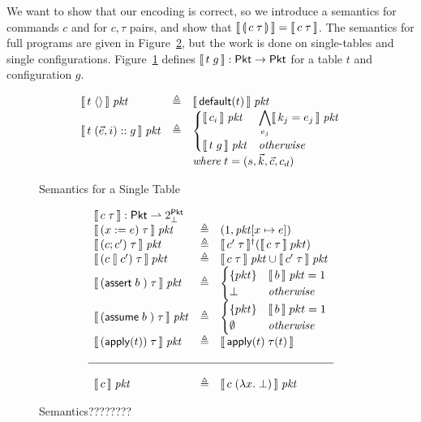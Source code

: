 We want to show that our encoding is correct, so we introduce a semantics for
commands $c$ and for $c,\tau$ pairs, and show that
$\llbracket\,\llparenthesis\, c\; \tau\, \rrparenthesis\,\rrbracket = \llbracket\,c\; \tau\,\rrbracket$. The semantics for full
programs are given in Figure~\ref{fig:semantics}, but the work is done on
single-tables and single configurations. Figure~\ref{fig:tablesemantics} defines
$\llbracket\,t\; g\,\rrbracket : \mathsf{Pkt} \to \mathsf{Pkt}$ for a table $t$ and configuration $g$.

\begin{figure}[ht]
  \[\begin{array}{lcl}
      \llbracket\,t\; \langle\rangle\,\rrbracket\; \mathit{pkt}
      &\triangleq& \llbracket\,\mathsf{default}(t)\,\rrbracket\; \mathit{pkt} \\
      \llbracket\, t\; (\vec e, i)::g\,\rrbracket\; \mathit{pkt}
      &\triangleq& \begin{cases}
        \llbracket\,c_i\,\rrbracket\; \mathit{pkt} & \displaystyle \bigwedge_{e_j} \llbracket\,k_j = e_j\,\rrbracket\; \mathit{pkt} \\
        \llbracket\,t\; g\,\rrbracket\; \mathit{pkt} & \mathit{otherwise}
      \end{cases}\\
      && \mathit{where}\; t = (s, \vec k, \vec c, c_d)
    \end{array}\]
  \caption{Semantics for a Single Table}
  \label{fig:tablesemantics}
\end{figure}


\begin{figure}[ht]
  \[\begin{array}{lcl}
      \multicolumn 3 l {\bracbb{c\; \tau} : \Pkt \rightharpoonup 2^\Pkt_\bot} \\
      \bracbb{(x:=e)\; \tau}\; \pkt & \triangleq & (1,\pkt[x \mapsto e]) \\
      \bracbb{(c;c')\; \tau}\; \pkt & \triangleq & \bracbb{c'\; \tau}^\dag(\bracbb{c\; \tau}\; pkt) \\
      \bracbb{(c\angel c')\; \tau}\; pkt &\triangleq& \bracbb{c\; \tau}\; \pkt \cup \bracbb{c'\; \tau}\; \pkt \\
      \bracbb{(\assert b)\; \tau}\; \pkt &\triangleq& \begin{cases}
        \{pkt\}   & \bracbb{b}\; \pkt = \TRUE \\
        \bot & \mathit{otherwise}
      \end{cases} \\
      \bracbb{(\assume b)\; \tau}\; \pkt &\triangleq& \begin{cases}
        \{pkt\} & \bracbb{b}\; pkt = \TRUE \\
        \emptyset    & \mathit{otherwise}
      \end{cases} \\
      \bracbb{(\apply t)\; \tau}\; \pkt &\triangleq& \bracbb{\apply t\; \tau(t)} \\\\\hline\\
      \bracbb c \; \pkt & \triangleq& \bracbb{c\; (\lambda x. \;\bot)}\; \pkt

    \end{array}\]
  
  \caption{Semantics????????}
  \label{fig:semantics}

\end{figure}

